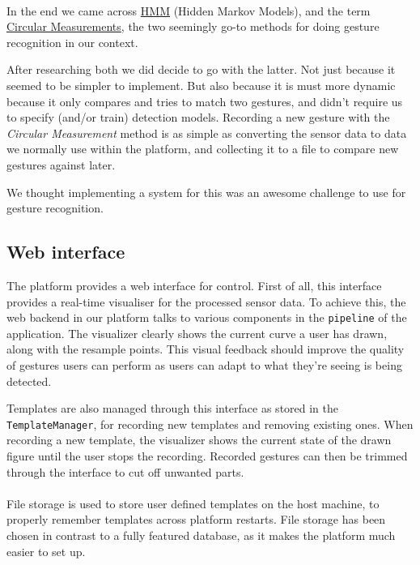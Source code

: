 \documentclass{standalone}
\begin{document}
  \paragraph{}
  In the end we came across
  \href{http://www.creativedistraction.com/demos/gesture-recognition-kinect-with-hidden-markov-models-hmms/}{HMM}
  (Hidden Markov Models), and the term
  \href{http://delivery.acm.org/10.1145/3140000/3134139/p12-balcazar.pdf}{Circular
  Measurements}, the two seemingly go-to methods for doing gesture recognition
  in our context.

  After researching both we did decide to go with the latter.
  Not just because it seemed to be simpler to implement. But also because it is
  must more dynamic because it only compares and tries to match two gestures,
  and didn't require us to specify (and/or train) detection models.
  Recording a new gesture with the \emph{Circular Measurement} method is as
  simple as converting the sensor data to data we normally use within the
  platform, and collecting it to a file to compare new gestures against later.

  We thought implementing a system for this was an awesome challenge to use for
  gesture recognition.

  \subsection{Web interface}
  The platform provides a web interface for control. First of all, this
  interface provides a real-time visualiser for the processed sensor data. To
  achieve this, the web backend in our platform talks to various components in
  the \verb_pipeline_ of the application. The visualizer clearly shows the
  current curve a user has drawn, along with the resample points. This visual
  feedback should improve the quality of gestures users can perform as users
  can adapt to what they're seeing is being detected.

  Templates are also managed through this interface as stored in the
  \verb_TemplateManager_, for recording new templates and removing existing
  ones. When recording a new template, the visualizer shows the current state
  of the drawn figure until the user stops the recording. Recorded gestures can
  then be trimmed through the interface to cut off unwanted parts.

  \paragraph{}
  File storage is used to store user defined templates on the host machine, to
  properly remember templates across platform restarts. File storage has been
  chosen in contrast to a fully featured database, as it makes the platform much
  easier to set up.
\end{document}
